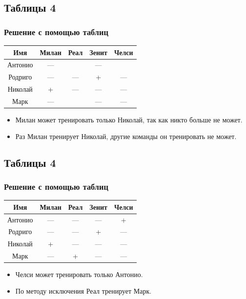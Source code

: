 \documentclass[compress,red]{beamer}
\begin{document}
\subsection{Таблицы 4}
\begin{frame}[fragile]
  \frametitle{Решение с помощью таблиц}
  
  \center
  {
  \begin{tabular}{|c|c|c|c|c|}
    \hline
    Имя & Милан & Реал  & Зенит & Челси \\
    \hline
    Антонио & --- &   & --- & \\
    \hline
    Родриго & ---  & ---  & +  & --- \\
    \hline
    Николай & + & ---  & ---  & --- \\ 
    \hline
    Марк & --- &   & --- & --- \\
    \hline
  \end{tabular}
  }
  \begin{itemize}
    \item Милан может тренировать только Николай, так как никто больше не может.
    \item Раз Милан тренирует Николай, другие команды он тренировать не может.
  \end{itemize}
\end{frame}

\subsection{Таблицы 4}
\begin{frame}[fragile]
  \frametitle{Решение с помощью таблиц}
  
  \center
  {
  \begin{tabular}{|c|c|c|c|c|}
    \hline
    Имя & Милан & Реал  & Зенит & Челси \\
    \hline
    Антонио & --- & ---   & --- & + \\
    \hline
    Родриго & ---  & ---  & +  & --- \\
    \hline
    Николай & + & ---  & ---  & --- \\ 
    \hline
    Марк & --- & + & --- & --- \\
    \hline
  \end{tabular}
  }
  \begin{itemize}
    \item Челси может тренировать только Антонио.
    \item По методу исключения Реал тренирует Марк.
  \end{itemize}
\end{frame}
\end{document}
